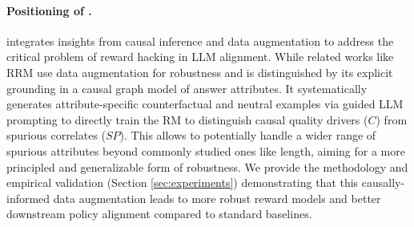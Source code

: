 \paragraph{Positioning of \carma.}
\carma{} integrates insights from causal inference and data augmentation to address the critical problem of reward hacking in LLM alignment. While related works like RRM \citep{liu2024rrm} use data augmentation for robustness and  \carma{} is distinguished by its explicit grounding in a causal graph model of answer attributes. It systematically generates attribute-specific counterfactual and neutral examples via guided LLM prompting to directly train the RM to distinguish causal quality drivers ($C$) from spurious correlates ($SP$). This allows \carma{} to potentially handle a wider range of spurious attributes beyond commonly studied ones like length, aiming for a more principled and generalizable form of robustness. We provide the methodology and empirical validation (Section \ref{sec:experiments}) demonstrating that this causally-informed data augmentation leads to more robust reward models and better downstream policy alignment compared to standard baselines.